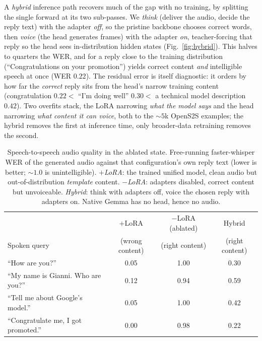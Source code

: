 \documentclass[11pt]{article}
\begin{document}
A \emph{hybrid} inference path recovers much of the gap with no training, by splitting the
single forward at its two sub-passes. We \emph{think} (deliver the audio, decide the reply
text) with the adapter \emph{off}, so the pristine backbone chooses correct words, then
\emph{voice} (the head generates frames) with the adapter \emph{on}, teacher-forcing that
reply so the head sees in-distribution hidden states (Fig.~\ref{fig:hybrid}). This halves
to quarters the WER, and for a reply close to the training distribution
(``Congratulations on your promotion'') yields correct content \emph{and} intelligible
speech at once (WER $0.22$). The residual error is itself diagnostic: it orders by how far
the \emph{correct} reply sits from the head's narrow training content (congratulation
$0.22 <$ ``I'm doing well'' $0.30 <$ a technical model description $0.42$). Two overfits
stack, the LoRA narrowing \emph{what the model says} and the head narrowing \emph{what
content it can voice}, both to the ${\sim}5$k OpenS2S examples; the hybrid removes the
first at inference time, only broader-data retraining removes the second.

\begin{table}[tbp]\centering
\caption{Speech-to-speech audio quality in the ablated state. Free-running faster-whisper
WER of the generated audio against that configuration's own reply text (lower is better;
${\sim}1.0$ is unintelligible). \emph{$+$LoRA}: the trained unified model, clean audio but
out-of-distribution \emph{template} content. \emph{$-$LoRA}: adapters disabled, correct
content but unvoiceable. \emph{Hybrid}: think with adapters off, voice the chosen reply
with adapters on. Native Gemma has no head, hence no audio.}
\label{tab:ablated-audio}
\small
\begin{tabular}{p{4.4cm}ccc}\toprule
 & $+$LoRA & $-$LoRA (ablated) & Hybrid \\
Spoken query & (wrong content) & (right content) & (right content) \\ \midrule
``How are you?''                      & 0.05 & 1.00 & 0.30 \\
``My name is Gianni. Who are you?''   & 0.12 & 0.94 & 0.59 \\
``Tell me about Google's model.''     & 0.05 & 1.00 & 0.42 \\
``Congratulate me, I got promoted.''  & 0.00 & 0.98 & 0.22 \\ \bottomrule
\end{tabular}
\end{table}
\end{document}
